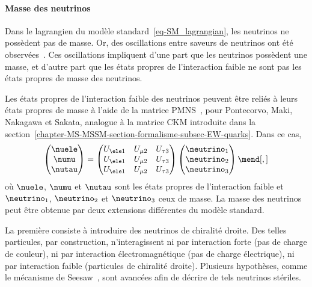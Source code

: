 \paragraph{Masse des neutrinos}
Dans le lagrangien du modèle standard~\eqref{eq-SM_lagrangian}, les neutrinos ne possèdent pas de masse.
Or, des oscillations entre saveurs de neutrinos ont été observées~\cite{neutrino_oscillations_1,neutrino_oscillations_2}.
Ces oscillations impliquent d'une part que les neutrinos possèdent une masse, et d'autre part que les états propres de l'interaction faible ne sont pas les états propres de masse des neutrinos.
\par
Les états propres de l'interaction faible des neutrinos peuvent être reliés à leurs états propres de masse à l'aide de la matrice PMNS~\cite{PMNS_MNS}, pour Pontecorvo, Maki, Nakagawa et Sakata, analogue à la matrice CKM introduite dans la section~\ref{chapter-MS-MSSM-section-formalisme-subsec-EW-quarks}.
Dans ce cas,
\begin{equation}
\begin{pmatrix}
\nuele \\ \numu \\ \nutau
\end{pmatrix}
=
\begin{pmatrix}
U_{\ele 1} & U_{\mu 2} & U_{\tau 3} \\
U_{\ele 1} & U_{\mu 2} & U_{\tau 3} \\
U_{\ele 1} & U_{\mu 2} & U_{\tau 3} \\
\end{pmatrix}
\begin{pmatrix}
\neutrino_1 \\ \neutrino_2 \\ \neutrino_3
\end{pmatrix}
\mend[,]
\end{equation}
où $\nuele$, $\numu$ et $\nutau$ sont les états propres de l'interaction faible et $\neutrino_1$, $\neutrino_2$ et $\neutrino_3$ ceux de masse.
La masse des neutrinos peut être obtenue par deux extensions différentes du modèle standard.
\par
La première consiste à introduire des neutrinos de chiralité droite.
Des telles particules, par construction, n'interagissent ni par interaction forte (pas de charge de couleur), ni par interaction électromagnétique (pas de charge électrique), ni par interaction faible (particules de chiralité droite).
Plusieurs hypothèses, comme le mécanisme de Seesaw~\cite{neutrino_masses_1,neutrino_masses_2,neutrino_masses_3,neutrino_masses_4,neutrino_masses_5}, sont avancées afin de décrire de tels neutrinos stériles.
